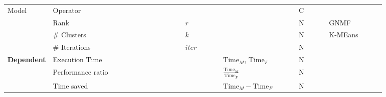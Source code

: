 \begin{tabular}{lp{0.35\linewidth}p{0.10\linewidth}>{\footnotesize}p{0.2\linewidth}p{0.08\linewidth}p{0.15\linewidth}}
  \multirow[t]{4}{*}{Model}              & Operator                                &                                   &                                         & C    &                                      \\
                                         & Rank                                    & $r$                               &                                         & N    & GNMF                                 \\
                                         & \# Clusters                             & $k$                               &                                         & N    & K-MEans                              \\
                                         & \# Iterations                           & $iter$                            &                                         & N    &                                      \\

  \multirow[t]{3}{*}{\textbf{Dependent}} & Execution Time                          &                                   & $\text{Time}_M$, $\text{Time}_F$        & N    &                                      \\
                                         & Performance ratio                       &                                   & $\frac{\text{Time}_M}{\text{Time}_F}$   & N    &                                      \\
                                         & Time saved                              &                                   & $\text{Time}_M - \text{Time}_F$         & N    &                                      \\

  \bottomrule
\end{tabular}
